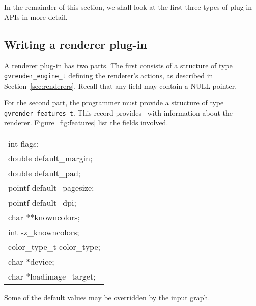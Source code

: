 In the remainder of this section, we shall look at the first 
three types of plug-in APIs in more detail.

\subsection{Writing a renderer plug-in}
\label{sec:plugin}
A renderer plug-in has two parts.
The first consists of a structure of type {\tt gvrender\_engine\_t}
defining the renderer's actions, as described in Section~\ref{sec:renderers}.
Recall that any field may contain a NULL pointer. 

For the second part, the programmer must provide a structure of type 
{\tt gvrender\_features\_t}. This record provides \gviz\ with
information about the renderer. 
Figure~\ref{fig:features} list the fields involved.
\begin{figure*}[htbp]
\centering
\begin{tabular}{|l|} \hline
int flags; \\
double default\_margin; \\
double default\_pad; \\
pointf default\_pagesize; \\
pointf default\_dpi; \\
char **knowncolors; \\
int sz\_knowncolors; \\
color\_type\_t color\_type; \\
char *device; \\
char *loadimage\_target; \\
\hline
\end{tabular}
\caption{Features of a renderer}
\label{fig:features}
\end{figure*}
Some of the default values may be overridden by the input graph.

